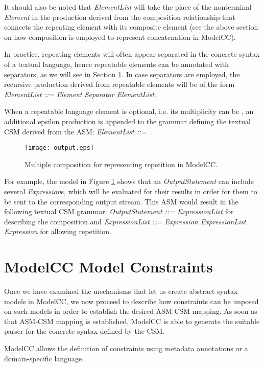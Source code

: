 \documentclass[preprint]{elsarticle}
\newcommand{\etexttt}[1]{\textit{#1}}
\begin{document}
It should also be noted that \etexttt{ElementList} will take the place of the nonterminal \etexttt{Element} in the production derived from the composition relationship that connects the repeating element with its composite element (see the above section on how composition is employed to represent concatenation in ModelCC).

In practice, repeating elements will often appear separated in the concrete syntax of a textual language, hence repeatable elements can be annotated with separators, as we will see in Section \ref{sec:modelconstraints}.
In case separators are employed, the recursive production derived from repeatable elements will be of the form \etexttt{ElementList ::= Element Separator ElementList}.

When a repeatable language element is optional, i.e. its multiplicity can be , an additional epsilon production is appended to the grammar defining the textual CSM derived from the ASM: \etexttt{ElementList ::= }.

\begin{figure}[tb!]
\centering
\texttt{[image: output.eps]}
\caption{Multiple composition for representing repetition in ModelCC.} \label{fig:output}
\end{figure}

For example, the model in Figure \ref{fig:output} shows that an \emph{OutputStatement} can include several \emph{Expression}s, which will be evaluated for their results in order for them to be sent to the corresponding output stream.
This ASM would result in the following textual CSM grammar: \etexttt{OutputStatement ::= ExpressionList} for describing the composition and \etexttt{ExpressionList ::= Expression ExpressionList  Expression} for allowing repetition.

\section{ModelCC Model Constraints} \label{sec:modelconstraints}

Once we have examined the mechanisms that let us create abstract syntax models in ModelCC, we now proceed to describe how constraints can be imposed on such models in order to establish the desired ASM-CSM mapping.
As soon as that ASM-CSM mapping is established, ModelCC is able to generate the suitable parser for the concrete syntax defined by the CSM.

ModelCC allows the definition of constraints using metadata annotations or a domain-specific language.
\end{document}
